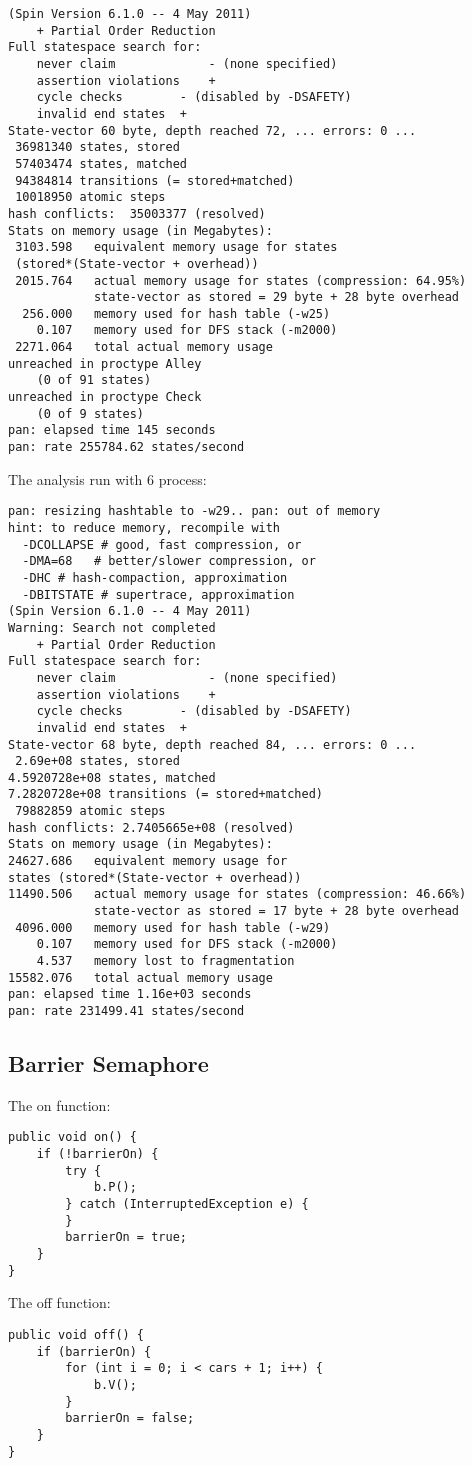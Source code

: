 \begin{lstlisting}
(Spin Version 6.1.0 -- 4 May 2011)
	+ Partial Order Reduction
Full statespace search for:
	never claim         	- (none specified)
	assertion violations	+
	cycle checks       	- (disabled by -DSAFETY)
	invalid end states	+
State-vector 60 byte, depth reached 72, ... errors: 0 ...
 36981340 states, stored
 57403474 states, matched
 94384814 transitions (= stored+matched)
 10018950 atomic steps
hash conflicts:  35003377 (resolved)
Stats on memory usage (in Megabytes):
 3103.598	equivalent memory usage for states 
 (stored*(State-vector + overhead))
 2015.764	actual memory usage for states (compression: 64.95%)
         	state-vector as stored = 29 byte + 28 byte overhead
  256.000	memory used for hash table (-w25)
    0.107	memory used for DFS stack (-m2000)
 2271.064	total actual memory usage
unreached in proctype Alley
	(0 of 91 states)
unreached in proctype Check
	(0 of 9 states)
pan: elapsed time 145 seconds
pan: rate 255784.62 states/second
\end{lstlisting}

The analysis run with 6 process:
\begin{lstlisting}
pan: resizing hashtable to -w29.. pan: out of memory
hint: to reduce memory, recompile with
  -DCOLLAPSE # good, fast compression, or
  -DMA=68   # better/slower compression, or
  -DHC # hash-compaction, approximation
  -DBITSTATE # supertrace, approximation
(Spin Version 6.1.0 -- 4 May 2011)
Warning: Search not completed
	+ Partial Order Reduction
Full statespace search for:
	never claim         	- (none specified)
	assertion violations	+
	cycle checks       	- (disabled by -DSAFETY)
	invalid end states	+
State-vector 68 byte, depth reached 84, ... errors: 0 ...
 2.69e+08 states, stored
4.5920728e+08 states, matched
7.2820728e+08 transitions (= stored+matched)
 79882859 atomic steps
hash conflicts: 2.7405665e+08 (resolved)
Stats on memory usage (in Megabytes):
24627.686	equivalent memory usage for 
states (stored*(State-vector + overhead))
11490.506	actual memory usage for states (compression: 46.66%)
         	state-vector as stored = 17 byte + 28 byte overhead
 4096.000	memory used for hash table (-w29)
    0.107	memory used for DFS stack (-m2000)
    4.537	memory lost to fragmentation
15582.076	total actual memory usage
pan: elapsed time 1.16e+03 seconds
pan: rate 231499.41 states/second
\end{lstlisting}

\subsection{Barrier Semaphore}
\label{sec:barrier}
The on function:
\begin{lstlisting}
public void on() {
	if (!barrierOn) {
		try {
			b.P();
		} catch (InterruptedException e) {
		}
		barrierOn = true;
	}
}
\end{lstlisting}
The off function:
\begin{lstlisting}
public void off() {
	if (barrierOn) {
		for (int i = 0; i < cars + 1; i++) {
			b.V();
		}
		barrierOn = false;
	}
}
\end{lstlisting}

